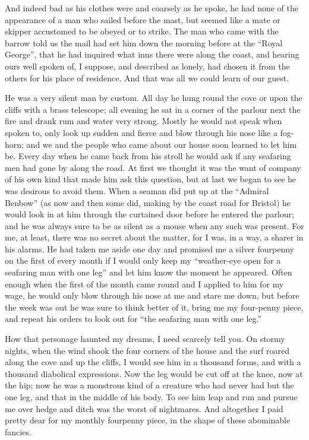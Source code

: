 And indeed bad as his clothes were and coarsely as he spoke, he had none of the appearance of a man who sailed before the mast, but seemed like a mate or skipper accustomed to be obeyed or to strike. The man who came with the barrow told us the mail had set him down the morning before at the \enquote{Royal George}, that he had inquired what inns there were along the coast, and hearing ours well spoken of, I suppose, and described as lonely, had chosen it from the others for his place of residence. And that was all we could learn of our guest.

He was a very silent man by custom. All day he hung round the cove or upon the cliffs with a brass telescope; all evening he sat in a corner of the parlour next the fire and drank rum and water very strong. Mostly he would not speak when spoken to, only look up sudden and fierce and blow through his nose like a fog-horn; and we and the people who came about our house soon learned to let him be. Every day when he came back from his stroll he would ask if any seafaring men had gone by along the road. At first we thought it was the want of company of his own kind that made him ask this question, but at last we began to see he was desirous to avoid them. When a seaman did put up at the \enquote{Admiral Benbow} (as now and then some did, making by the coast road for Bristol) he would look in at him through the curtained door before he entered the parlour; and he was always sure to be as silent as a mouse when any such was present. For me, at least, there was no secret about the matter, for I was, in a way, a sharer in his alarms. He had taken me aside one day and promised me a silver fourpenny on the first of every month if I would only keep my \enquote{weather-eye open for a seafaring man with one leg} and let him know the moment he appeared. Often enough when the first of the month came round and I applied to him for my wage, he would only blow through his nose at me and stare me down, but before the week was out he was sure to think better of it, bring me my four-penny piece, and repeat his orders to look out for \enquote{the seafaring man with one leg.}

How that personage haunted my dreams, I need scarcely tell you. On stormy nights, when the wind shook the four corners of the house and the surf roared along the cove and up the cliffs, I would see him in a thousand forms, and with a thousand diabolical expressions. Now the leg would be cut off at the knee, now at the hip; now he was a monstrous kind of a creature who had never had but the one leg, and that in the middle of his body. To see him leap and run and pursue me over hedge and ditch was the worst of nightmares. And altogether I paid pretty dear for my monthly fourpenny piece, in the shape of these abominable fancies.

